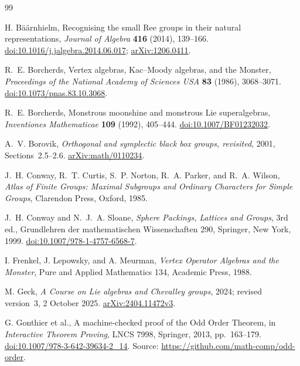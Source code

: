 \documentclass[11pt]{article}
\numberwithin{equation}{section}
\theoremstyle{definition}
\begin{document}
\FloatBarrier

\begingroup\small
\begin{thebibliography}{99}
\setlength{\itemsep}{0pt}
\setlength{\parskip}{0pt}

H. B\"a\"arnhielm, Recognising the small Ree groups in their natural
representations, \emph{Journal of Algebra} \textbf{416} (2014), 139--166.
\href{https://doi.org/10.1016/j.jalgebra.2014.06.017}{doi:10.1016/j.jalgebra.2014.06.017};
\href{https://arxiv.org/abs/1206.0411}{arXiv:1206.0411}.

R.~E. Borcherds,
Vertex algebras, Kac--Moody algebras, and the Monster,
\emph{Proceedings of the National Academy of Sciences USA}
\textbf{83} (1986), 3068--3071.
\href{https://doi.org/10.1073/pnas.83.10.3068}{doi:10.1073/pnas.83.10.3068}.

R.~E. Borcherds,
Monstrous moonshine and monstrous Lie superalgebras,
\emph{Inventiones Mathematicae} \textbf{109} (1992), 405--444.
\href{https://doi.org/10.1007/BF01232032}{doi:10.1007/BF01232032}.

A.~V. Borovik, \emph{Orthogonal and symplectic black box groups,
revisited}, 2001, Sections~2.5--2.6.
\href{https://arxiv.org/abs/math/0110234}{arXiv:math/0110234}.

J.~H. Conway, R.~T. Curtis, S.~P. Norton, R.~A. Parker, and R.~A. Wilson,
\emph{Atlas of Finite Groups: Maximal Subgroups and Ordinary Characters
for Simple Groups}, Clarendon Press, Oxford, 1985.

J.~H. Conway and N.~J.~A. Sloane,
\emph{Sphere Packings, Lattices and Groups}, 3rd ed., Grundlehren der
mathematischen Wissenschaften 290, Springer, New York, 1999.
\href{https://doi.org/10.1007/978-1-4757-6568-7}{doi:10.1007/978-1-4757-6568-7}.

I. Frenkel, J. Lepowsky, and A. Meurman,
\emph{Vertex Operator Algebras and the Monster},
Pure and Applied Mathematics 134, Academic Press, 1988.

M. Geck, \emph{A Course on Lie algebras and Chevalley groups},
2024; revised version~3, 2 October 2025.
\href{https://arxiv.org/abs/2404.11472v3}{arXiv:2404.11472v3}.

G. Gonthier et al., A machine-checked proof of the Odd Order Theorem,
in \emph{Interactive Theorem Proving}, LNCS 7998, Springer, 2013,
pp.~163--179.
\href{https://doi.org/10.1007/978-3-642-39634-2_14}{doi:10.1007/978-3-642-39634-2\_14}.
Source: \url{https://github.com/math-comp/odd-order}.


\end{thebibliography}
\end{document}
